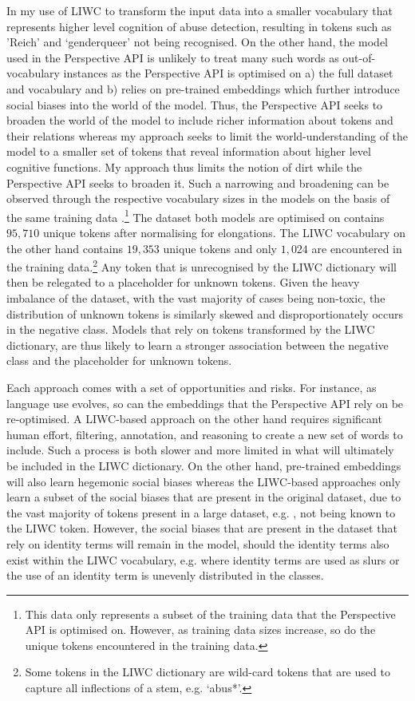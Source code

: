 In my use of LIWC to transform the input data into a smaller vocabulary that represents higher level cognition of abuse detection, resulting in tokens such as 'Reich' and `genderqueer' not being recognised.
On the other hand, the model used in the Perspective API is unlikely to treat many such words as out-of-vocabulary instances as the Perspective API is optimised on a) the full dataset and vocabulary and b) relies on pre-trained embeddings which further introduce social biases into the world of the model.
Thus, the Perspective API seeks to broaden the world of the model to include richer information about tokens and their relations whereas my approach seeks to limit the world-understanding of the model to a smaller set of tokens that reveal information about higher level cognitive functions.
My approach thus limits the notion of dirt while the Perspective API seeks to broaden it.
Such a narrowing and broadening can be observed through the respective vocabulary sizes in the models on the basis of the same training data \citep{Wulczyn:2017}.\footnote{This data only represents a subset of the training data that the Perspective API is optimised on. However, as training data sizes increase, so do the unique tokens encountered in the training data.}
The dataset both models are optimised on contains $95,710$ unique tokens after normalising for elongations.
The LIWC vocabulary on the other hand contains $19,353$ unique tokens and only $1,024$ are encountered in the training data.\footnote{Some tokens in the LIWC dictionary are wild-card tokens that are used to capture all inflections of a stem, e.g. `abus*'.}
Any token that is unrecognised by the LIWC dictionary will then be relegated to a placeholder for unknown tokens.
Given the heavy imbalance of the dataset, with the vast majority of cases being non-toxic, the distribution of unknown tokens is similarly skewed and disproportionately occurs in the negative class.
Models that rely on tokens transformed by the LIWC dictionary, are thus likely to learn a stronger association between the negative class and the placeholder for unknown tokens.

Each approach comes with a set of opportunities and risks.
For instance, as language use evolves, so can the embeddings that the Perspective API rely on be re-optimised.
A LIWC-based approach on the other hand requires significant human effort, filtering, annotation, and reasoning to create a new set of words to include.
Such a process is both slower and more limited in what will ultimately be included in the LIWC dictionary.
On the other hand, pre-trained embeddings will also learn hegemonic social biases \citep{Bender:2021} whereas the LIWC-based approaches only learn a subset of the social biases that are present in the original dataset, due to the vast majority of tokens present in a large dataset, e.g. \citep{Wulczyn:2017}, not being known to the LIWC token. 
However, the social biases that are present in the dataset that rely on identity terms will remain in the model, should the identity terms also exist within the LIWC vocabulary, e.g. where identity terms are used as slurs or the use of an identity term is unevenly distributed in the classes.

